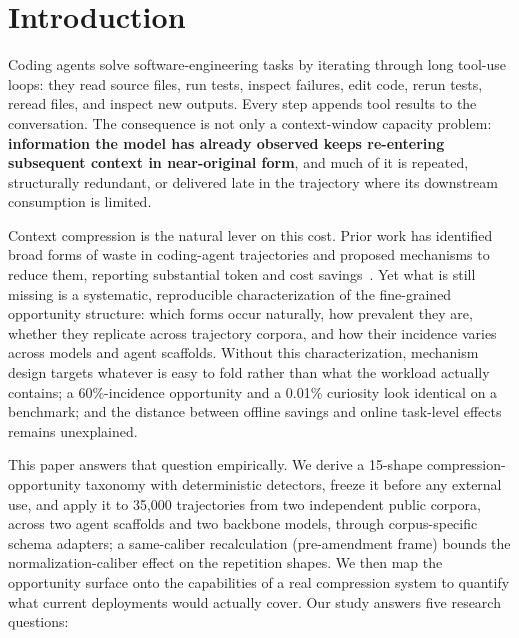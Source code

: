 ﻿\documentclass[sigconf,balance=false]{acmart}
\begin{document}
\maketitle

\section{Introduction}

Coding agents solve software-engineering tasks by iterating through long tool-use loops: they read source files, run tests, inspect failures, edit code, rerun tests, reread files, and inspect new outputs. Every step appends tool results to the conversation. The consequence is not only a context-window capacity problem: \textbf{information the model has already observed keeps re-entering subsequent context in near-original form}, and much of it is repeated, structurally redundant, or delivered late in the trajectory where its downstream consumption is limited.

Context compression is the natural lever on this cost. Prior work has identified broad forms of waste in coding-agent trajectories and proposed mechanisms to reduce them, reporting substantial token and cost savings~\cite{agentdiet2026}. Yet what is still missing is a systematic, reproducible characterization of the fine-grained opportunity structure: which forms occur naturally, how prevalent they are, whether they replicate across trajectory corpora, and how their incidence varies across models and agent scaffolds. Without this characterization, mechanism design targets whatever is easy to fold rather than what the workload actually contains; a 60\%-incidence opportunity and a 0.01\% curiosity look identical on a benchmark; and the distance between offline savings and online task-level effects remains unexplained.

This paper answers that question empirically. We derive a 15-shape compression-opportunity taxonomy with deterministic detectors, freeze it before any external use, and apply it to 35{,}000 trajectories from two independent public corpora, across two agent scaffolds and two backbone models, through corpus-specific schema adapters; a same-caliber recalculation (pre-amendment frame) bounds the normalization-caliber effect on the repetition shapes. We then map the opportunity surface onto the capabilities of a real compression system to quantify what current deployments would actually cover. Our study answers five research questions:
\end{document}

